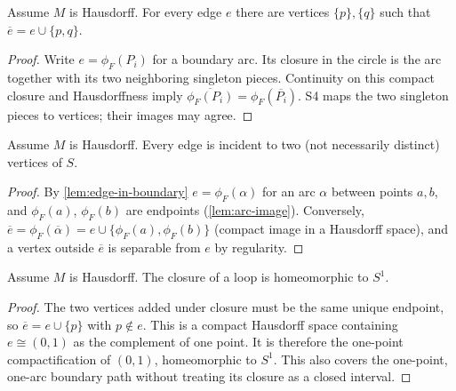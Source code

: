       \begin{lemma}\label{lem:closure-edge}

        Assume $M$ is Hausdorff. For every edge $e$ there are vertices
        $\{p\},\{q\}$ such that $\overline e=e\cup\{p,q\}$.
      \end{lemma}
      \begin{proof}

        Write $e=\phi_F(P_i)$ for a boundary arc. Its closure in the circle
        is the arc together with its two neighboring singleton pieces.
        Continuity on this compact closure and Hausdorffness imply
        $\overline{\phi_F(P_i)}=\phi_F(\overline{P_i})$.
        S4 maps the two singleton pieces to vertices; their images may agree.
      \end{proof}

      \begin{lemma}\label{lem:endpoints-card}

        Assume $M$ is Hausdorff. Every edge is incident to two (not
        necessarily distinct) vertices of $S$.
      \end{lemma}
      \begin{proof}

        By \cref{lem:edge-in-boundary} $e = \phi_F(\alpha)$ for an arc $\alpha$
        between points $a, b$, and $\phi_F(a)$, $\phi_F(b)$ are endpoints
        (\cref{lem:arc-image}). Conversely, $\overline{e} =
        \phi_F(\overline{\alpha}) = e \cup \{\phi_F(a), \phi_F(b)\}$ (compact
        image in a Hausdorff space), and a vertex outside $\overline{e}$ is
        separable from $e$ by regularity.
      \end{proof}

      \begin{lemma}\label{lem:loop-circle}

        Assume $M$ is Hausdorff. The closure of a loop is homeomorphic to $S^1$.
      \end{lemma}
      \begin{proof}

        The two vertices added under closure must be the same unique
        endpoint, so $\overline e=e\cup\{p\}$ with $p\notin e$.
        This is a compact Hausdorff space containing $e\cong(0,1)$ as the
        complement of one point. It is therefore the one-point compactification
        of $(0,1)$, homeomorphic to $S^1$. This also covers the one-point,
        one-arc boundary path without treating its closure as a closed interval.
      \end{proof}

